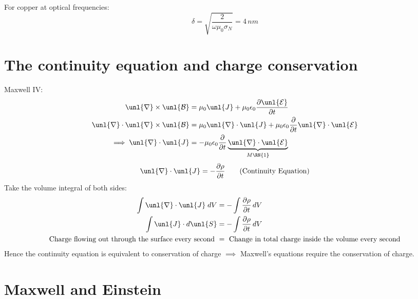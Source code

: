 \documentclass[a4paper, 11pt, normalem]{report}
\newcommand\p{\partial}
\newcommand\E{\mathcal{E}}
\newcommand\uE{\unl{\E}}
\newcommand\B{\mathcal{B}}
\newcommand\uB{\unl{\B}}
\newcommand\del{\unl{\nabla}}
\newcommand\eno{\epsilon_0}
\newcommand\om{\omega}
\newcommand\J{\unl{J}}
\begin{document}
For copper at optical frequencies:
\begin{equation*}
    \delta = \sqrt{\frac{2}{\om\mu_0\sigma_N}} = 4\,nm
\end{equation*}

\section{The continuity equation and charge conservation}
Maxwell \RN{4}:
\begin{align*}
    \del\times\uB &= \mu_0\J + \mu_0\eno\frac{\p\uE}{\p t} \\
    \del\cdot\del\times\uB &= \mu_0\del\cdot\J + \mu_0\eno\frac{\p}{\p t}\del\cdot\uE \\
    \implies \del\cdot\J &= -\mu_0\eno\frac{\p}{\p t}\underbrace{\del\cdot\uE}_{M\RN{1}}
\end{align*}
\begin{equation}
    \del\cdot\J = -\frac{\p\rho}{\p t} \tag{Continuity Equation}
\end{equation}
Take the volume integral of both sides:
\begin{align*}
    \int \del\cdot\J\;dV &= -\int \frac{\p\rho}{\p t}\,dV \\
    \int \J \cdot d\unl{S} &= -\int \frac{\p\rho}{\p t}\,dV \\
    \text{Charge flowing out through the surface every second } &= \text{ Change in total charge inside the volume every second}
\end{align*}
Hence the continuity equation is equivalent to conservation of charge $\implies$ Maxwell's equations require the conservation of charge.

\section{Maxwell and Einstein}
\end{document}
